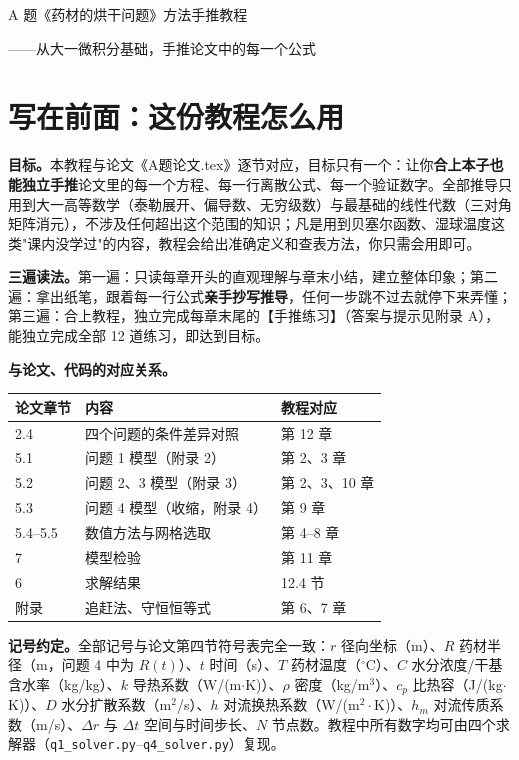 \documentclass[12pt,a4paper]{ctexart}
\begin{document}
\begin{center}
{\heiti{} A 题《药材的烘干问题》方法手推教程\par}
\vspace{0.4em}
{\heiti{} ——从大一微积分基础，手推论文中的每一个公式\par}
\end{center}

\section*{写在前面：这份教程怎么用}

\textbf{目标。}本教程与论文《A题论文.tex》逐节对应，目标只有一个：让你\textbf{合上本子也能独立手推}论文里的每一个方程、每一行离散公式、每一个验证数字。全部推导只用到大一高等数学（泰勒展开、偏导数、无穷级数）与最基础的线性代数（三对角矩阵消元），不涉及任何超出这个范围的知识；凡是用到贝塞尔函数、湿球温度这类"课内没学过"的内容，教程会给出准确定义和查表方法，你只需会用即可。

\textbf{三遍读法。}第一遍：只读每章开头的直观理解与章末小结，建立整体印象；第二遍：拿出纸笔，跟着每一行公式\textbf{亲手抄写推导}，任何一步跳不过去就停下来弄懂；第三遍：合上教程，独立完成每章末尾的【手推练习】（答案与提示见附录 A），能独立完成全部 12 道练习，即达到目标。

\textbf{与论文、代码的对应关系。}

\begin{center}
{\begin{tabular}{lll}
\toprule
论文章节 & 内容 & 教程对应 \\
\midrule
2.4 & 四个问题的条件差异对照 & 第 12 章 \\
5.1 & 问题 1 模型（附录 2） & 第 2、3 章 \\
5.2 & 问题 2、3 模型（附录 3） & 第 2、3、10 章 \\
5.3 & 问题 4 模型（收缩，附录 4） & 第 9 章 \\
5.4--5.5 & 数值方法与网格选取 & 第 4--8 章 \\
7 & 模型检验 & 第 11 章 \\
6 & 求解结果 & 12.4 节 \\
附录 & 追赶法、守恒恒等式 & 第 6、7 章 \\
\bottomrule
\end{tabular}}
\end{center}

\textbf{记号约定。}全部记号与论文第四节符号表完全一致：$r$ 径向坐标（m）、$R$ 药材半径（m，问题 4 中为 $R(t)$）、$t$ 时间（s）、$T$ 药材温度（$^\circ$C）、$C$ 水分浓度/干基含水率（kg/kg）、$k$ 导热系数（W/(m$\cdot$K)）、$\rho$ 密度（kg/m$^3$）、$c_p$ 比热容（J/(kg$\cdot$K)）、$D$ 水分扩散系数（m$^2$/s）、$h$ 对流换热系数（W/(m$^2\!\cdot$K)）、$h_m$ 对流传质系数（m/s）、$\Delta r$ 与 $\Delta t$ 空间与时间步长、$N$ 节点数。教程中所有数字均可由四个求解器（\texttt{q1\_solver.py}--\texttt{q4\_solver.py}）复现。
\end{document}
